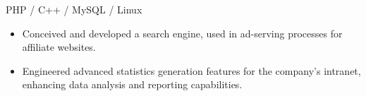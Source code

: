 PHP / C++ / MySQL / Linux
\begin{itemize}
  \item Conceived and developed a search engine, used in ad-serving processes for affiliate websites. 
  \item Engineered advanced statistics generation features for the company’s intranet, enhancing data analysis and reporting capabilities.
\end{itemize}
\divider
